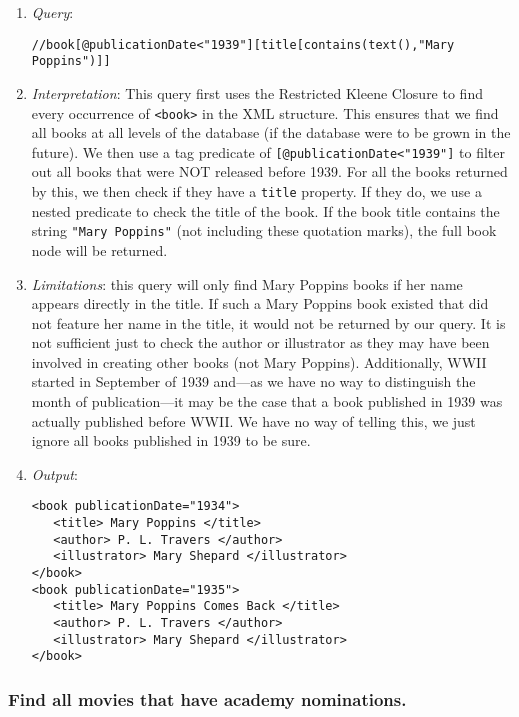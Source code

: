 \documentclass[11pt]{article}
\begin{document}
\begin{enumerate}
\item \textit{Query}:
\begin{small}
\begin{verbatim}
//book[@publicationDate<"1939"][title[contains(text(),"Mary Poppins")]]
\end{verbatim}
\end{small}
\item \textit{Interpretation}: This query first uses the Restricted Kleene Closure to find every occurrence of \texttt{<book>} in the XML structure. This ensures that we find all books at all levels of the database (if the database were to be grown in the future). We then use a tag predicate of \texttt{[@publicationDate<"1939"]} to filter out all books that were NOT released before 1939. For all the books returned by this, we then check if they have a \texttt{title} property. If they do, we use a nested predicate to check the title of the book. If the book title contains the string \texttt{"Mary Poppins"} (not including these quotation marks), the full book node will be returned.
\item \textit{Limitations}: this query will only find Mary Poppins books if her name appears directly in the title. If such a Mary Poppins book existed that did not feature her name in the title, it would not be returned by our query. It is not sufficient just to check the author or illustrator as they may have been involved in creating other books (not Mary Poppins). Additionally, WWII started in September of 1939 and---as we have no way to distinguish the month of publication---it may be the case that a book published in 1939 was actually published before WWII. We have no way of telling this, we just ignore all books published in 1939 to be sure.
\item \textit{Output}:
\begin{verbatim}
<book publicationDate="1934">
   <title> Mary Poppins </title>
   <author> P. L. Travers </author>
   <illustrator> Mary Shepard </illustrator>
</book>
<book publicationDate="1935">
   <title> Mary Poppins Comes Back </title>
   <author> P. L. Travers </author>
   <illustrator> Mary Shepard </illustrator>
</book>
\end{verbatim} 
\end{enumerate}


\subsubsection{Find all movies that have academy nominations.}
\end{document}
